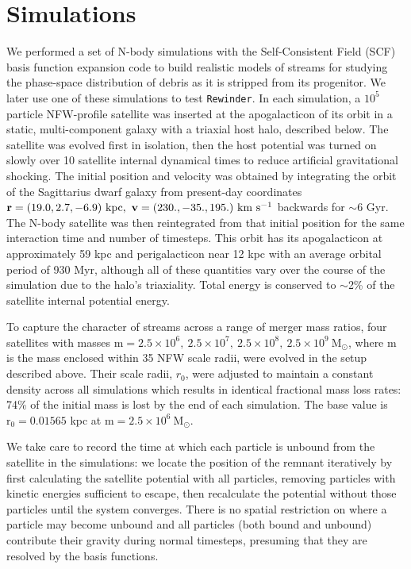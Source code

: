 \documentclass{emulateapj}
\newcommand{\msun}{\mathrm{M}_\odot}
\newcommand{\rewinder}{\texttt{Rewinder}}
\begin{document}
\section{Simulations}\label{sec:sims}
We performed a set of N-body simulations with the Self-Consistent Field (SCF) basis function expansion code \citep{hernquist92} to build realistic models of streams for studying the phase-space distribution of debris as it is stripped from its progenitor. We later use one of these simulations to test \rewinder. In each simulation, a $10^5$ particle NFW-profile satellite was inserted at the apogalacticon of its orbit in a static, multi-component galaxy with a triaxial host halo, described below. The satellite was evolved first in isolation, then the host potential was turned on slowly over 10 satellite internal dynamical times to reduce artificial gravitational shocking. The initial position and velocity was obtained by integrating the orbit of the Sagittarius dwarf galaxy from present-day coordinates ${\bf r}  =(19.0, 2.7, -6.9)\ \mathrm{kpc}, \ {\bf v} = (230., -35., 195.) \ \mathrm{km\ s^{-1}}$ \citep{law10} backwards for $\sim$6 Gyr. The N-body satellite was then reintegrated from that initial position for the same interaction time and number of timesteps. This orbit has its apogalacticon at approximately 59 kpc and perigalacticon near 12 kpc with an average orbital period of 930 Myr, although all of these quantities vary over the course of the simulation due to the halo's triaxiality. Total energy is conserved to $\sim$2\% of the satellite internal potential energy.

To capture the character of streams across a range of merger mass ratios, four satellites with masses $\mathrm{m} = 2.5 \times 10^6,\ 2.5 \times 10^7,\ 2.5 \times 10^8,\ 2.5 \times 10^9\ \msun$, where m is the mass enclosed within 35 NFW scale radii, were evolved in the setup described above. Their scale radii, $r_0$, were adjusted to maintain a constant density across all simulations which results in identical fractional mass loss rates: 74\% of the initial mass is lost by the end of each simulation. The base value is $\mathrm{r_0}=0.01565$ kpc at $\mathrm{m} = 2.5 \times 10^6\ \msun$.

We take care to record the time at which each particle is unbound from the satellite in the simulations: we locate the position of the remnant iteratively by first calculating the satellite potential with all particles, removing particles with kinetic energies sufficient to escape, then recalculate the potential without those particles until the system converges. There is no spatial restriction on where a particle may become unbound and all particles (both bound and unbound) contribute their gravity during normal timesteps, presuming that they are resolved by the basis functions. 
\end{document}
